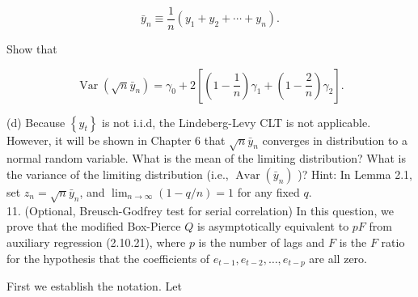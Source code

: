 \documentclass[10pt]{article}
\begin{document}
$$
\bar{y}_{n} \equiv \frac{1}{n}\left(y_{1}+y_{2}+\cdots+y_{n}\right) .
$$

Show that

$$
\operatorname{Var}\left(\sqrt{n} \bar{y}_{n}\right)=\gamma_{0}+2\left[\left(1-\frac{1}{n}\right) \gamma_{1}+\left(1-\frac{2}{n}\right) \gamma_{2}\right] .
$$

(d) Because $\left\{y_{t}\right\}$ is not i.i.d, the Lindeberg-Levy CLT is not applicable. However, it will be shown in Chapter 6 that $\sqrt{n} \bar{y}_{n}$ converges in distribution to a normal random variable. What is the mean of the limiting distribution? What is the variance of the limiting distribution (i.e., $\operatorname{Avar}\left(\bar{y}_{n}\right)$ )? Hint: In Lemma 2.1, set $z_{n}=\sqrt{n} \bar{y}_{n}$, and $\lim _{n \rightarrow \infty}(1-q / n)=1$ for any fixed $q$.\\
11. (Optional, Breusch-Godfrey test for serial correlation) In this question, we prove that the modified Box-Pierce $Q$ is asymptotically equivalent to $p F$ from auxiliary regression (2.10.21), where $p$ is the number of lags and $F$ is the $F$ ratio for the hypothesis that the coefficients of $e_{t-1}, e_{t-2}, \ldots, e_{t-p}$ are all zero.

First we establish the notation. Let
\end{document}
